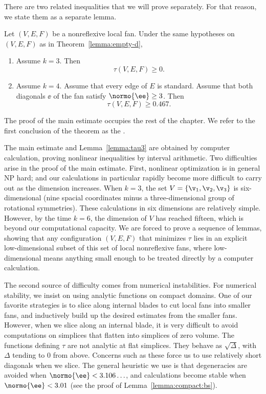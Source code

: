 There are two related inequalities that we will prove separately. For that reason,
we state them as a separate lemma.

\begin{lemma}\label{lemma:tau3}
Let $(V,E,F)$ be a nonreflexive local fan.
Under the same hypotheses on $(V,E,F)$ as in Theorem~\ref{lemma:empty-d}, 
\begin{enumerate}
\item Assume $k=3$. Then
\[\tau(V,E,F)\ge 0.\]
\item Assume $k=4$.  Assume that every edge of $E$ is standard.
Assume that both diagonals $\ee$ of the fan satisfy $\normo{\ee}\ge3$.
Then
\[
\tau(V,E,F)\ge 0.467.
\]
\end{enumerate}
\end{lemma}

The proof of the main estimate occupies the rest of the chapter.
We refer to the first conclusion of the theorem as the .  

The main estimate and Lemma~\ref{lemma:tau3} are obtained by computer
calculation, proving nonlinear inequalities by interval arithmetic.
Two  difficulties
arise in the proof of  the main estimate.  First, nonlinear optimization is
in general NP hard; and our calculations in particular rapidly become
more difficult to carry out as the dimension increases.  When $k=3$,
the set $V=\{\v_1,\v_2,\v_3\}$ is six-dimensional (nine spacial
coordinates minus a three-dimensional group of rotational symmetries).
These calculations in six dimensions are relatively simple.  However,
by the time $k=6$, the dimension of $V$ has reached fifteen, which is 
beyond our computational capacity.  We are forced to prove a sequence of
lemmas, showing that any configuration $(V,E,F)$ that minimizes $\tau$
lies in an explicit low-dimensional subset of this set of local
nonreflexive fans, where low-dimensional means anything small enough
to be treated directly by a computer calculation.

The second source of difficulty comes from numerical instabilities.
For numerical stability, we insist on using analytic functions on
compact domains.  One of our favorite strategies is to slice along
internal blades to cut local fans into smaller fans, and inductively
build up the desired estimates from the smaller fans.  However, when
we slice along an internal blade, it is very difficult to avoid computations on
simplices that flatten into simplices of zero volume.  
The functions defining $\tau$ are not analytic at flat simplices. They behave as
$\sqrt{\Delta}$, with $\Delta$ tending to $0$ from above.  Concerns
such as these force us to use relatively short diagonals when we
slice.  The general heuristic we use is that degeneracies are avoided when
$\normo{\ee}< 3.106\ldots$, and calculations become stable
when $\normo{\ee}<3.01$  (see the proof of
Lemma~\ref{lemma:compact:bs}).

